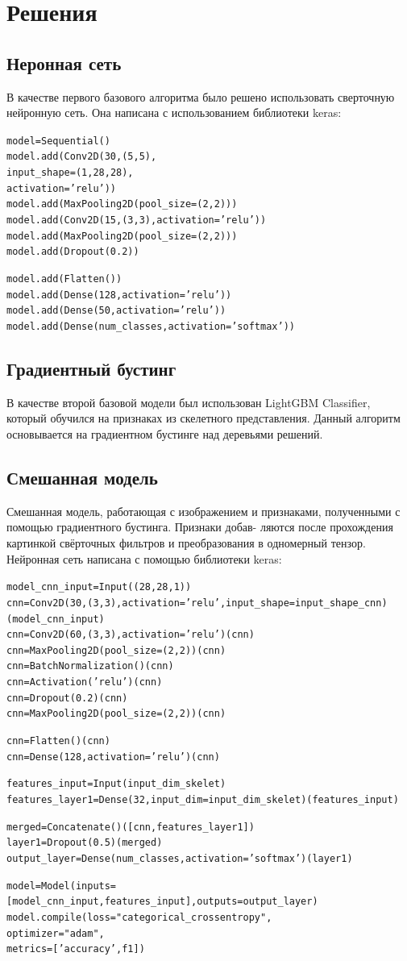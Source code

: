 \documentclass{llncs}
\begin{document}
\section{Решения}
\subsection{Неронная сеть}
В качестве первого базового алгоритма было решено использовать сверточную нейронную сеть. Она написана с использованием библиотеки keras:
\begin{alltt}
model = Sequential()
model.add(Conv2D(30, (5, 5), 
    input_shape=(1, 28, 28), 
    activation='relu'))
model.add(MaxPooling2D(pool_size=(2, 2)))
model.add(Conv2D(15, (3, 3), activation='relu'))
model.add(MaxPooling2D(pool_size=(2, 2)))
model.add(Dropout(0.2))
    
model.add(Flatten())
model.add(Dense(128, activation='relu'))
model.add(Dense(50, activation='relu'))
model.add(Dense(num_classes, activation='softmax'))
\end{alltt}

\subsection{Градиентный бустинг}
В качестве второй базовой модели был использован LightGBM Classifier, который обучился на признаках из скелетного представления. Данный алгоритм основывается на градиентном бустинге над деревьями решений.

\subsection{Смешанная модель}
Смешанная модель, работающая с изображением и признаками, полученными с помощью градиентного бустинга. Признаки добав-
ляются после прохождения картинкой свёрточных
фильтров и преобразования в одномерный тензор. Нейронная сеть написана с помощью библиотеки keras:
\begin{alltt}
model_cnn_input = Input((28, 28, 1))
cnn = Conv2D(30, (3, 3), activation='relu', input_shape = input_shape_cnn)(model_cnn_input)
cnn = Conv2D(60, (3, 3), activation='relu')(cnn)
cnn = MaxPooling2D(pool_size=(2, 2))(cnn)
cnn = BatchNormalization()(cnn) 
cnn = Activation('relu')(cnn)
cnn = Dropout(0.2)(cnn)
cnn = MaxPooling2D(pool_size=(2, 2))(cnn)

cnn = Flatten()(cnn)
cnn = Dense(128, activation='relu')(cnn)

features_input = Input(input_dim_skelet)
features_layer1 = Dense(32, input_dim=input_dim_skelet)(features_input)

merged = Concatenate()([cnn, features_layer1])
layer1 = Dropout(0.5)(merged)
output_layer = Dense(num_classes, activation='softmax')(layer1)

model = Model(inputs=[model_cnn_input, features_input], outputs=output_layer)
model.compile(loss="categorical_crossentropy",
              optimizer="adam",
              metrics=['accuracy', f1])
\end{alltt}
\end{document}
